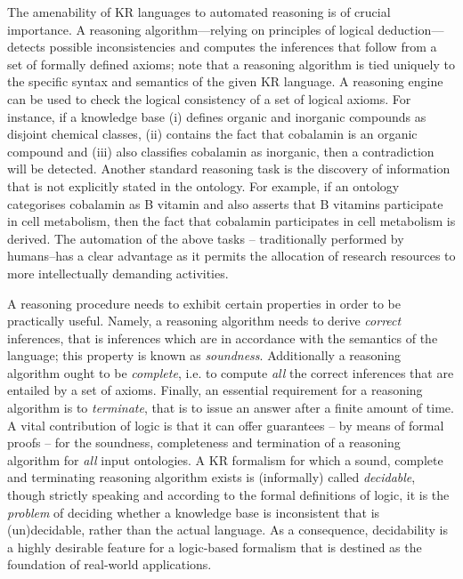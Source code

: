 \documentclass[10pt]{bmc_article}
\newenvironment{bmcformat}{\baselineskip20pt\sloppy\setboolean{publ}{false}}{\baselineskip20pt\sloppy}
\begin{document}
\begin{bmcformat}
The amenability of KR languages to automated reasoning is of crucial importance. A reasoning algorithm---relying on principles of logical deduction--- detects possible inconsistencies and computes the inferences that follow from a set of formally defined axioms; note that a reasoning algorithm is tied uniquely to the specific syntax and semantics of the given KR language. A reasoning engine can be used to check the logical consistency of a set of logical axioms. For instance, if a knowledge base (i) defines organic and inorganic compounds as disjoint chemical classes, (ii) contains the fact that cobalamin is an organic compound and (iii) also classifies cobalamin as inorganic, then a contradiction will be detected. Another standard reasoning task is the discovery of information that is not explicitly stated in the ontology. For example, if an ontology categorises cobalamin as B vitamin and also asserts that B vitamins participate in cell metabolism, then the fact that cobalamin participates in cell metabolism is derived. The automation of the above tasks -- traditionally performed by humans--has a clear advantage as it permits the allocation of research resources to more intellectually demanding activities.

A reasoning procedure needs to exhibit certain properties in order to be practically useful. Namely, a reasoning algorithm needs to derive \emph{correct} inferences, that is inferences which are in accordance with the semantics of the language; this property is known as \emph{soundness}. Additionally a reasoning algorithm ought to be \emph{complete}, i.e. to compute \emph{all} the correct inferences that are entailed by a set of axioms. Finally, an essential requirement for a reasoning algorithm is to \emph{terminate}, that is to issue an answer after a finite amount of time. A vital contribution of logic is that it can offer guarantees -- by means of formal proofs -- for the soundness, completeness and termination of a reasoning algorithm for \emph{all} input ontologies. A KR formalism for which a sound, complete and terminating reasoning algorithm exists is (informally) called \emph{decidable}, though strictly speaking and according to the formal definitions of logic, it is the \emph{problem} of deciding whether a knowledge base is inconsistent that is (un)decidable, rather than the actual language. As a consequence, decidability is a highly desirable feature for a logic-based formalism that is destined as the foundation of real-world applications.


\end{bmcformat}
\end{document}
